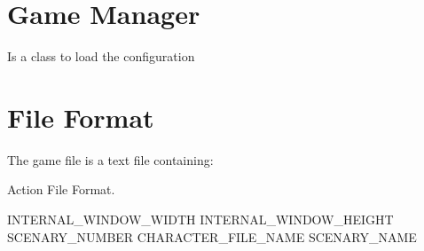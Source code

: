 \section{Game Manager}
Is a class to load the configuration 


\section{File Format}
The game file is a text file containing:

	\begin{algorithm}[H]
		\caption{Action File Format.}
		\label{algoEvalCuda}
		\begin{algorithmic}
			\STATE [int] INTERNAL\_WINDOW\_WIDTH
			\STATE [int] INTERNAL\_WINDOW\_HEIGHT
			\STATE [int] SCENARY\_NUMBER
			\STATE [string] CHARACTER\_FILE\_NAME
				\STATE [string] SCENARY\_NAME
			\ENDFOR
		\end{algorithmic}
	\end{algorithm}